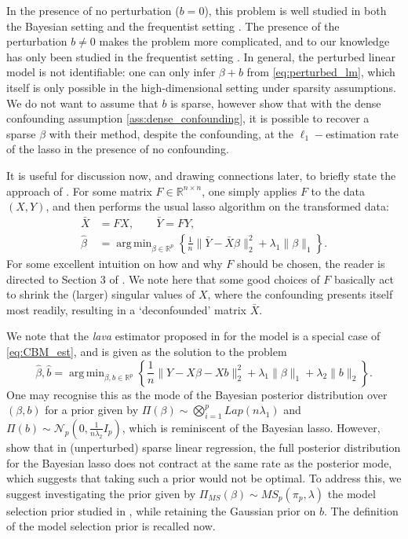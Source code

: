 \documentclass[11pt]{article}
\newcommand{\R}{\mathbb{R}}
\newcommand{\Pims}{\Pi_{MS}}
\DeclareMathOperator*{\argmin}{arg\,min}
\begin{document}
In the presence of no perturbation ($b = 0$), this problem is well studied in both the Bayesian setting \citep{CS-HV2015} and the frequentist setting \citep{Tibshirani1996}. The presence of the perturbation $b \neq 0$ makes the problem more complicated, and to our knowledge has only been studied in the frequentist setting \citep{CBM2020, Chernozhukov2017}. 
In general, the perturbed linear model is not identifiable: one can only infer $\beta + b$ from \eqref{eq:perturbed_lm}, which itself is only possible in the high-dimensional setting under sparsity assumptions. We do not want to assume that $b$ is sparse, however \cite{CBM2020} show that with the dense confounding assumption \eqref{ass:dense_confounding}, it is possible to recover a sparse $\beta$ with their method, despite the confounding, at the $\ell_1-$estimation rate of the lasso in the presence of no confounding.

 It is useful for discussion now, and drawing connections later, to briefly state the approach of \cite{CBM2020}. For some matrix $F \in \R^{n \times n}$, one simply applies $F$ to the data $(X, Y)$, and then performs the usual lasso algorithm on the transformed data:
 \begin{align}
 \bar{X} &= F X, \qquad \bar{Y} = FY, \nonumber \\
\hat{\beta}  &= \argmin_{\beta \in \mathbb{R}^p} \left\{\frac{1}{n}\|\bar{Y} - \bar{X}\beta\|_2^2 + \lambda_1\|\beta\|_1  \right\}	\label{eq:CBM_est}.
 \end{align}
 For some excellent intuition on how and why $F$ should be chosen, the reader is directed to Section 3 of \cite{CBM2020}. We note here that some good choices of $F$ basically act to shrink the (larger) singular values of $X$, where the confounding presents itself most readily, resulting in a `deconfounded' matrix $\bar{X}$.
 
  We note that the {\it lava} estimator proposed in \cite{Chernozhukov2017} for the model is a special case of \eqref{eq:CBM_est}, and is given as the solution to the problem
  $$
\hat{\beta}, \hat{b}  = \argmin_{\beta, b \in \mathbb{R}^p} \left\{\frac{1}{n}\|Y - X\beta - Xb\|_2^2 + \lambda_1\|\beta\|_1 + \lambda_2\|b\|_2  \right\}.
  $$
  One may recognise this as the mode of the Bayesian posterior distribution over $(\beta, b)$ for a prior given by $\Pi(\beta) \sim \bigotimes_{i=1}^p Lap(n\lambda_1)$ and $\Pi(b) \sim \mathcal{N}_p(0, \frac{1}{n\lambda_2}I_p)$, which is reminiscent of the Bayesian lasso. However, \cite{CS-HV2015} show that in (unperturbed) sparse linear regression, the full posterior distribution for the Bayesian lasso does not contract at the same rate as the posterior mode, which suggests that taking such a prior would not be optimal. To address this, we suggest investigating the prior given by $\Pims(\beta) \sim MS_p(\pi_p, \lambda)$ the model selection prior studied in \cite{CS-HV2015}, while retaining the Gaussian prior on $b$. The definition of the model selection prior is recalled now.
  
\end{document}
